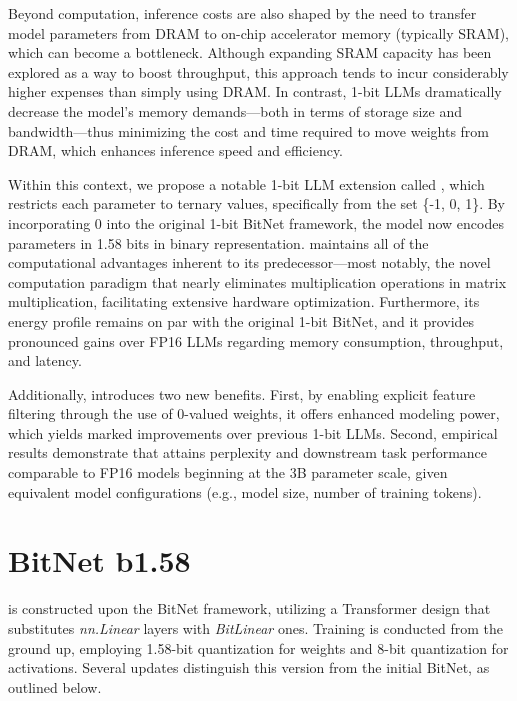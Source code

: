 Beyond computation, inference costs are also shaped by the need to transfer model parameters from DRAM to on-chip accelerator memory (typically SRAM), which can become a bottleneck. Although expanding SRAM capacity has been explored as a way to boost throughput, this approach tends to incur considerably higher expenses than simply using DRAM. In contrast, 1-bit LLMs dramatically decrease the model's memory demands—both in terms of storage size and bandwidth—thus minimizing the cost and time required to move weights from DRAM, which enhances inference speed and efficiency.

Within this context, we propose a notable 1-bit LLM extension called \textbf{}, which restricts each parameter to ternary values, specifically from the set \{-1, 0, 1\}. By incorporating 0 into the original 1-bit BitNet framework, the model now encodes parameters in 1.58 bits in binary representation.  maintains all of the computational advantages inherent to its predecessor—most notably, the novel computation paradigm that nearly eliminates multiplication operations in matrix multiplication, facilitating extensive hardware optimization. Furthermore, its energy profile remains on par with the original 1-bit BitNet, and it provides pronounced gains over FP16 LLMs regarding memory consumption, throughput, and latency.

Additionally,  introduces two new benefits. First, by enabling explicit feature filtering through the use of 0-valued weights, it offers enhanced modeling power, which yields marked improvements over previous 1-bit LLMs. Second, empirical results demonstrate that  attains perplexity and downstream task performance comparable to FP16 models beginning at the 3B parameter scale, given equivalent model configurations (e.g., model size, number of training tokens).

\section{BitNet b1.58}

 is constructed upon the BitNet framework, utilizing a Transformer design that substitutes \emph{nn.Linear} layers with \emph{BitLinear} ones. Training is conducted from the ground up, employing 1.58-bit quantization for weights and 8-bit quantization for activations. Several updates distinguish this version from the initial BitNet, as outlined below.

